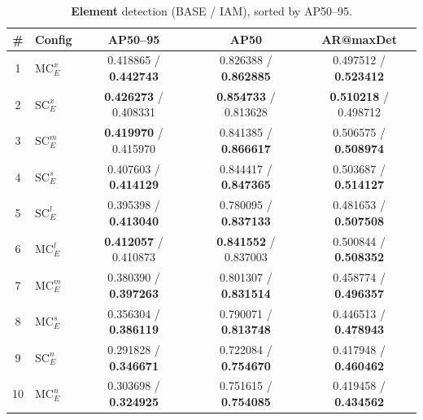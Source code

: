 \begin{table}[t]
  \centering
  \scriptsize
  \setlength{\tabcolsep}{4pt}
  \renewcommand{\arraystretch}{1.25}
  \caption{\textbf{Element} detection (BASE / IAM), sorted by AP50--95.}
  \begin{tabular}{|c|l|c|c|c|}
      \hline
      \textbf{\#} & Config & AP50--95 & AP50 & AR@maxDet \\
      \hline 1 & $\mathrm{MC}_{E}^{x}$ & 0.418865 / \textbf{0.442743} & 0.826388 / \textbf{0.862885} & 0.497512 / \textbf{0.523412} \\
      \hline 2 & $\mathrm{SC}_{E}^{x}$ & \textbf{0.426273} / 0.408331 & \textbf{0.854733} / 0.813628 & \textbf{0.510218} / 0.498712 \\
      \hline 3 & $\mathrm{SC}_{E}^{m}$ & \textbf{0.419970} / 0.415970 & 0.841385 / \textbf{0.866617} & 0.506575 / \textbf{0.508974} \\
      \hline 4 & $\mathrm{SC}_{E}^{s}$ & 0.407603 / \textbf{0.414129} & 0.844417 / \textbf{0.847365} & 0.503687 / \textbf{0.514127} \\
      \hline 5 & $\mathrm{SC}_{E}^{l}$ & 0.395398 / \textbf{0.413040} & 0.780095 / \textbf{0.837133} & 0.481653 / \textbf{0.507508} \\
      \hline 6 & $\mathrm{MC}_{E}^{l}$ & \textbf{0.412057} / 0.410873 & \textbf{0.841552} / 0.837003 & 0.500844 / \textbf{0.508352} \\
      \hline 7 & $\mathrm{MC}_{E}^{m}$ & 0.380390 / \textbf{0.397263} & 0.801307 / \textbf{0.831514} & 0.458774 / \textbf{0.496357} \\
      \hline 8 & $\mathrm{MC}_{E}^{s}$ & 0.356304 / \textbf{0.386119} & 0.790071 / \textbf{0.813748} & 0.446513 / \textbf{0.478943} \\
      \hline 9 & $\mathrm{SC}_{E}^{n}$ & 0.291828 / \textbf{0.346671} & 0.722084 / \textbf{0.754670} & 0.417948 / \textbf{0.460462} \\
      \hline 10 & $\mathrm{MC}_{E}^{n}$ & 0.303698 / \textbf{0.324925} & 0.751615 / \textbf{0.754085} & 0.419458 / \textbf{0.434562} \\
      \hline
  \end{tabular}
  \label{tab:elements}
\end{table}

